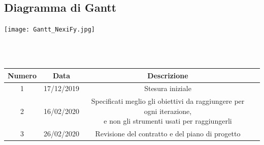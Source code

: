 \subsection{Diagramma di Gantt}
\vspace{0.5cm}
\begin{center}
	\hspace*{-2cm}\texttt{[image: Gantt\_NexiFy.jpg]}
\end{center}
\vspace{2cm}

\clearpage
{} \\ \\
\begin{tabular}{|c | c | c | c|} 
 	\hline
	 Numero & Data & Descrizione \\ [0.5ex] 
	\hline\hline
	1 & 17/12/2019 & Stesura iniziale \\ 
	\hline
	2 & 16/02/2020 & \thead{Specificati meglio gli obiettivi da raggiungere per ogni iterazione,\\e non gli strumenti usati per raggiungerli} \\ 
	\hline
	3 & 26/02/2020 & Revisione del contratto e del piano di progetto \\ 
	\hline
\end{tabular}